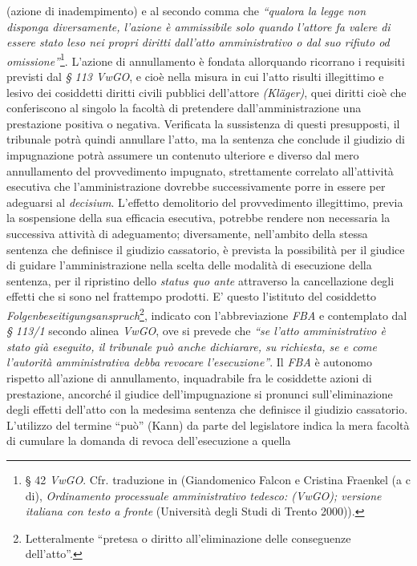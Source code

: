 \documentclass[12pt,it,a4paper,]{report}
\begin{document}
(azione di inadempimento) e al secondo comma che \emph{``qualora la
legge non disponga diversamente, l'azione è ammissibile solo quando
l'attore fa valere di essere stato leso nei propri diritti dall'atto
amministrativo o dal suo rifiuto od omissione''}\footnote{§ 42
  \emph{VwGO}. Cfr. traduzione in (Giandomenico Falcon e Cristina
  Fraenkel (a c di), \emph{Ordinamento processuale amministrativo
  tedesco: (VwGO); versione italiana con testo a fronte} (Università
  degli Studi di Trento 2000)).}. L'azione di annullamento è fondata
allorquando ricorrano i requisiti previsti dal \emph{§ 113 VwGO}, e cioè
nella misura in cui l'atto risulti illegittimo e lesivo dei cosiddetti
diritti civili pubblici dell'attore \emph{(Kläger)}, quei diritti cioè
che conferiscono al singolo la facoltà di pretendere
dall'amministrazione una prestazione positiva o negativa. Verificata la
sussistenza di questi presupposti, il tribunale potrà quindi annullare
l'atto, ma la sentenza che conclude il giudizio di impugnazione potrà
assumere un contenuto ulteriore e diverso dal mero annullamento del
provvedimento impugnato, strettamente correlato all'attività esecutiva
che l'amministrazione dovrebbe successivamente porre in essere per
adeguarsi al \emph{decisium}. L'effetto demolitorio del provvedimento
illegittimo, previa la sospensione della sua efficacia esecutiva,
potrebbe rendere non necessaria la successiva attività di adeguamento;
diversamente, nell'ambito della stessa sentenza che definisce il
giudizio cassatorio, è prevista la possibilità per il giudice di guidare
l'amministrazione nella scelta delle modalità di esecuzione della
sentenza, per il ripristino dello \emph{status quo ante} attraverso la
cancellazione degli effetti che si sono nel frattempo prodotti. E'
questo l'istituto del cosiddetto
\emph{Folgenbeseitigungsanspruch}\footnote{Letteralmente ``pretesa o
  diritto all'eliminazione delle conseguenze dell'atto''.}, indicato con
l'abbreviazione \emph{FBA} e contemplato dal \emph{§ 113/1} secondo
alinea \emph{VwGO}, ove si prevede che \emph{``se l'atto amministrativo
è stato già eseguito, il tribunale può anche dichiarare, su richiesta,
se e come l'autorità amministrativa debba revocare l'esecuzione''}. Il
\emph{FBA} è autonomo rispetto all'azione di annullamento, inquadrabile
fra le cosiddette azioni di prestazione, ancorché il giudice
dell'impugnazione si pronunci sull'eliminazione degli effetti dell'atto
con la medesima sentenza che definisce il giudizio cassatorio.
L'utilizzo del termine ``può'' (Kann) da parte del legislatore indica la
mera facoltà di cumulare la domanda di revoca dell'esecuzione a quella
\end{document}
